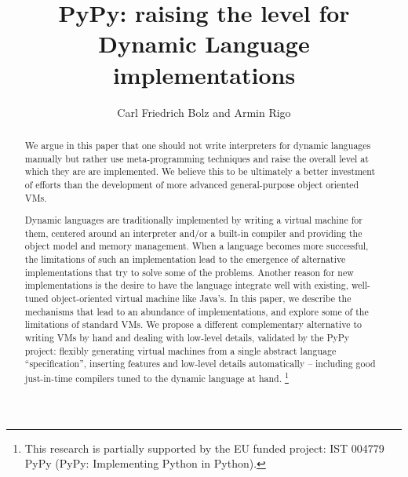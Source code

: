 \documentclass{llncs}
\begin{document}
\pagestyle{headings}

\title{PyPy: raising the level for Dynamic Language implementations}


\author{Carl Friedrich Bolz and Armin Rigo}




\maketitle

\begin{abstract}

We argue in this paper that one should not write interpreters for dynamic
languages manually but rather use meta-programming techniques and raise the
overall level at which they are are implemented. We believe this to be
ultimately a better investment of efforts than the development of more advanced
general-purpose object oriented VMs.

\smallskip

Dynamic languages are traditionally implemented by writing a virtual machine for
them, centered around an interpreter and/or a built-in compiler and providing
the object model and memory management. When a language becomes more successful,
the limitations of such an implementation lead to the emergence of alternative
implementations that try to solve some of the problems. Another reason for new
implementations is the desire to have the language integrate well with existing,
well-tuned object-oriented virtual machine like Java's. In this paper, we
describe the mechanisms that lead to an abundance of implementations, and
explore some of the limitations of standard VMs.  We propose a different
complementary alternative to writing VMs by hand and dealing with low-level
details, validated by the PyPy project: flexibly generating virtual machines
from a single abstract language ``specification'', inserting features and
low-level details automatically -- including good just-in-time compilers tuned
to the dynamic language at hand.
\footnote{This research is partially supported by the EU funded
 project: IST 004779 PyPy (PyPy: Implementing Python in Python).} \\

\end{abstract}
\end{document}
